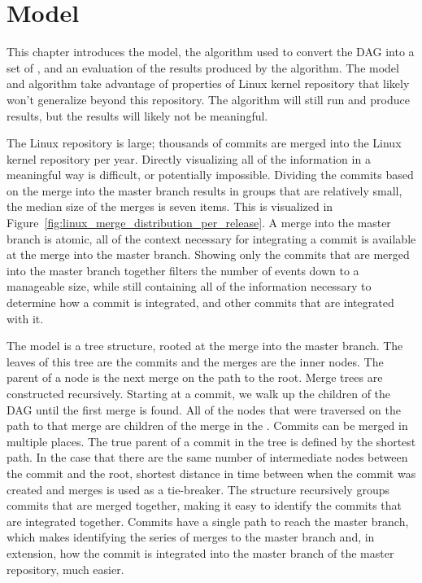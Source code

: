 \chapter{\mt{} Model}\label{chap:model}

This chapter introduces the \mt{} model, the algorithm used to
convert the DAG into a set of , and an evaluation of the results
produced by the algorithm.
The model and algorithm take advantage of properties of Linux kernel
repository that likely won't generalize beyond this repository.
The algorithm will still run and produce results, but the results will
likely not be meaningful.

The Linux repository is large;
thousands of commits are merged into the Linux kernel repository per
year.
Directly visualizing all of the information in a meaningful way is
difficult, or potentially impossible.
Dividing the commits based on the merge into the master branch results
in groups that are relatively small,
the median size of the merges is seven items.
This is visualized in
Figure~\ref{fig:linux_merge_distribution_per_release}.
A merge into the master branch is atomic, all of the context necessary
for integrating a commit is available at the merge into the master
branch.
Showing only the commits that are merged into the master
branch together filters the number of events down to a manageable size,
while still containing all of the information necessary to determine how
a commit is integrated, and other commits that are integrated with it.

The \mt{} model is a tree structure,
rooted at the merge into the master branch.
The leaves of this tree are the commits and the merges are the inner
nodes.
The parent of a node is the next merge on the path to the root.
Merge trees are constructed recursively.
Starting at a commit, we walk up the children of the DAG until the
first merge is found.
All of the nodes that were traversed on the path to that merge are
children of the merge in the \mt{}.
Commits can be merged in multiple places.
The true parent of a commit in the tree is defined by the shortest path.
In the case that there are the same number of intermediate nodes
between the commit and the root, shortest distance in time between when
the commit was created and merges is used as a tie-breaker.
The structure recursively groups commits that are merged together,
making it easy to identify the commits that are integrated together.
Commits have a single path to reach the master branch, which makes
identifying the series of merges to the master branch and, in extension,
how the commit is integrated into the master branch of the master
repository, much easier.

